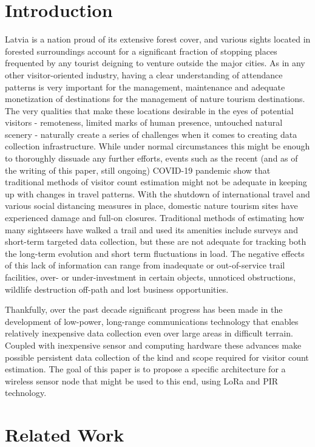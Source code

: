 \documentclass[10pt,nocopyrightspace]{ewsn-proc}
\begin{document}
\section{Introduction}
Latvia is a nation proud of its extensive forest cover, and various sights located in forested surroundings account for a significant fraction of stopping places frequented by any tourist deigning to venture outside the major cities. As in any other visitor-oriented industry, having a clear understanding of attendance patterns is very important for the management, maintenance and adequate monetization of destinations for the management of nature tourism destinations. The very qualities that make these locations desirable in the eyes of potential visitors - remoteness, limited marks of human presence, untouched natural scenery - naturally create a series of challenges when it comes to creating data collection infrastructure. While under normal circumstances this might be enough to thoroughly dissuade any further efforts, events such as the recent (and as of the writing of this paper, still ongoing) COVID-19 pandemic show that traditional methods of visitor count estimation might not be adequate in keeping up with changes in travel patterns. With the shutdown of international travel and various social distancing measures in place, domestic nature tourism sites have experienced damage\cite{TrailDestruct} and full-on closures\cite{TrailClose}. Traditional methods of estimating how many sightseers have walked a trail and used its amenities include surveys and short-term targeted data collection, but these are not adequate for tracking both the long-term evolution and short term fluctuations in load. The negative effects of this lack of information can range from inadequate or out-of-service trail facilities, over- or under-investment in certain objects, unnoticed obstructions, wildlife destruction off-path and lost business opportunities.

Thankfully, over the past decade significant progress has been made in the development of low-power, long-range communications technology that enables relatively inexpensive data collection even over large areas in difficult terrain. Coupled with inexpensive sensor and computing hardware these advances make possible persistent data collection of the kind and scope required for visitor count estimation. The goal of this paper is to propose a specific architecture for a wireless sensor node that might be used to this end, using LoRa and PIR technology.


\section{Related Work}
\end{document}
